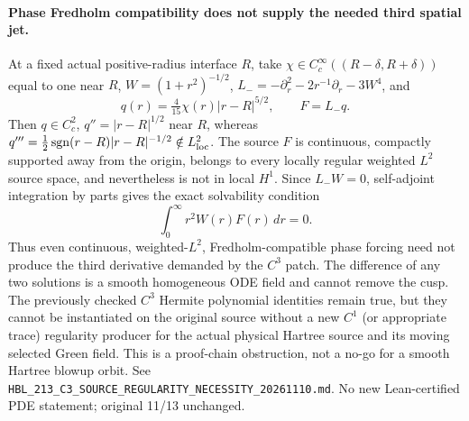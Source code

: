 \documentclass[11pt]{amsart}
\begin{document}
\paragraph{Phase Fredholm compatibility does not supply the needed third spatial jet.}
At a fixed actual positive-radius interface $R$, take
$\chi\in C_c^\infty((R-\delta,R+\delta))$ equal to one near $R$,
$W=(1+r^2)^{-1/2}$, $L_-=-\partial_r^2-2r^{-1}\partial_r-3W^4$,
and
\[
 q(r)=\tfrac4{15}\chi(r)|r-R|^{5/2},\qquad F=L_-q.
\]
Then $q\in C_c^2$, $q''=|r-R|^{1/2}$ near $R$, whereas
$q'''=\frac12\operatorname{sgn}(r-R)|r-R|^{-1/2}\notin L^2_{\rm loc}$.
The source $F$ is continuous, compactly supported away from the
origin, belongs to every locally regular weighted $L^2$ source
space, and nevertheless is not in local $H^1$. Since $L_-W=0$,
self-adjoint integration by parts gives the exact solvability condition
\[
 \int_0^\infty r^2W(r)F(r)\,dr=0.
\]
Thus even continuous, weighted-$L^2$, Fredholm-compatible phase forcing
need not produce the third derivative demanded by the $C^3$ patch.
The difference of any two solutions is a smooth homogeneous ODE field
and cannot remove the cusp. The previously checked $C^3$ Hermite
polynomial identities remain true, but they cannot be instantiated on
the original source without a new $C^1$ (or appropriate trace)
regularity producer for the actual physical Hartree source and its
moving selected Green field. This is a proof-chain obstruction, not a
no-go for a smooth Hartree blowup orbit. See
\texttt{HBL\_213\_C3\_SOURCE\_REGULARITY\_NECESSITY\_20261110.md}.
No new Lean-certified PDE statement; original 11/13 unchanged.



\end{document}
